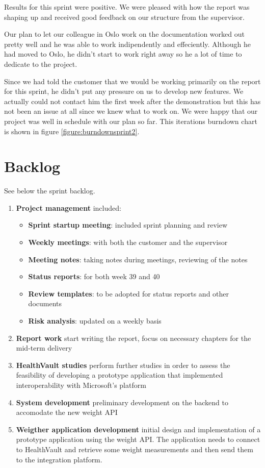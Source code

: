 Results for this sprint were positive. We were pleased with how the report was shaping up and received good feedback on our structure from the supervisor.

Our plan to let our colleague in Oslo work on the documentation worked out pretty well and he was able to work indipendently and effeciently. 
Although he had moved to Oslo, he didn't start to work right away so he a lot of time to dedicate to the project.

Since we had told the customer that we would be working primarily on the report for this sprint, he didn't put any pressure on us to develop new features. 
We actually could not contact him the first week after the demonstration but this has not been an issue at all since we knew what to work on. 
We were happy that our project was well in schedule with our plan so far.
This iterations burndown chart is shown in figure \ref{figure:burndownsprint2}.

\clearpage
\section{Backlog}

See below the sprint backlog.
\begin{enumerate}[1.]
	\item \textbf{Project management} included:
	\begin{itemize}
		\item \textbf{Sprint startup meeting}:
			included sprint planning and review
		\item \textbf{Weekly meetings}:
			with both the customer and the supervisor
		\item \textbf{Meeting notes}:
			taking notes during meetings, reviewing of the notes
		\item \textbf{Status reports}:
			for both week 39 and 40
		\item \textbf{Review templates}:
			to be adopted for status reports and other documents
		\item \textbf{Risk analysis}:
			updated on a weekly basis
	\end{itemize}
	\item \textbf{Report work}\newline
		start writing the report, focus on necessary chapters for the mid-term delivery
	\item \textbf{HealthVault studies}\newline
		perform further studies in order to assess the feasibility of developing a prototype
		application that implemented interoperability with Microsoft's platform
	\item \textbf{System development}\newline
		preliminary development on the backend to accomodate the new weight API
	\item \textbf{Weigther application development}\newline
		initial design and implementation of a prototype application using the weight API.
		The application needs to connect to HealthVault and retrieve some weight measurements
		and then send them to the integration platform.
\end{enumerate}